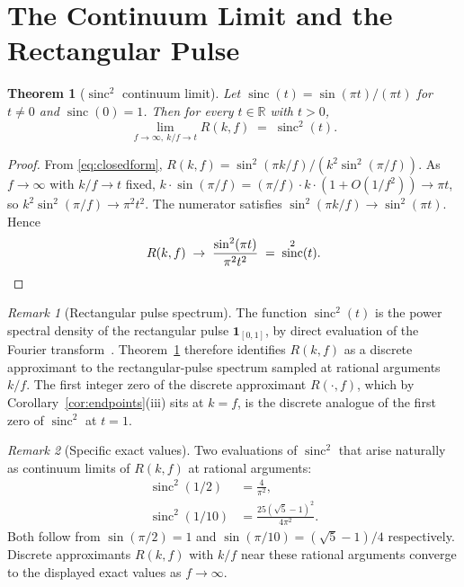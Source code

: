 \documentclass[11pt,reqno]{amsart}
\theoremstyle{plain}
\newtheorem{theorem}{Theorem}
\theoremstyle{definition}
\theoremstyle{remark}
\newtheorem*{remark}{Remark}
\DeclareMathOperator{\sinc}{sinc}
\newcommand{\R}{\mathbb{R}}
\begin{document}
\section{The Continuum Limit and the Rectangular Pulse}\label{sec:limit}

\begin{theorem}[$\sinc^{2}$ continuum limit]\label{thm:limit}
Let $\sinc(t) = \sin(\pi t)/(\pi t)$ for $t \ne 0$ and $\sinc(0)=1$.
Then for every $t \in \R$ with $t > 0$,
\[
  \lim_{f\to\infty,\ k/f \to t}
  R(k,f) \;=\; \sinc^{2}(t).
\]
\end{theorem}

\begin{proof}
From \eqref{eq:closedform}, $R(k,f) = \sin^{2}(\pi k/f)/(k^{2}
\sin^{2}(\pi/f))$. As $f \to \infty$ with $k/f \to t$ fixed,
$k \cdot \sin(\pi/f) = (\pi/f)\cdot k \cdot (1 + O(1/f^{2}))
\to \pi t$, so $k^{2}\sin^{2}(\pi/f) \to \pi^{2} t^{2}$. The
numerator satisfies $\sin^{2}(\pi k/f) \to \sin^{2}(\pi t)$.
Hence
\[
  R(k,f) \;\to\; \frac{\sin^{2}(\pi t)}{\pi^{2}t^{2}} \;=\; \sinc^{2}(t).
  \qedhere
\]
\end{proof}

\begin{remark}[Rectangular pulse spectrum]\label{rem:rectangular}
The function $\sinc^{2}(t)$ is the power spectral density of the
rectangular pulse $\mathbf{1}_{[0,1]}$, by direct evaluation of the
Fourier transform~\cite{Shannon1949,OppenheimSchafer2010}.
Theorem~\ref{thm:limit} therefore identifies $R(k,f)$ as a discrete
approximant to the rectangular-pulse spectrum sampled at rational
arguments $k/f$. The first integer zero of the discrete approximant
$R(\cdot,f)$, which by Corollary~\ref{cor:endpoints}(iii) sits at
$k = f$, is the discrete analogue of the first zero of $\sinc^{2}$
at $t = 1$.
\end{remark}

\begin{remark}[Specific exact values]\label{rem:exactvalues}
Two evaluations of $\sinc^{2}$ that arise naturally as continuum
limits of $R(k,f)$ at rational arguments:
\begin{align*}
  \sinc^{2}(1/2) &= \frac{4}{\pi^{2}}, \\
  \sinc^{2}(1/10) &= \frac{25(\sqrt{5}-1)^{2}}{4\pi^{2}}.
\end{align*}
Both follow from $\sin(\pi/2) = 1$ and
$\sin(\pi/10) = (\sqrt{5}-1)/4$ respectively. Discrete approximants
$R(k,f)$ with $k/f$ near these rational arguments converge to the
displayed exact values as $f \to \infty$.
\end{remark}
\end{document}
